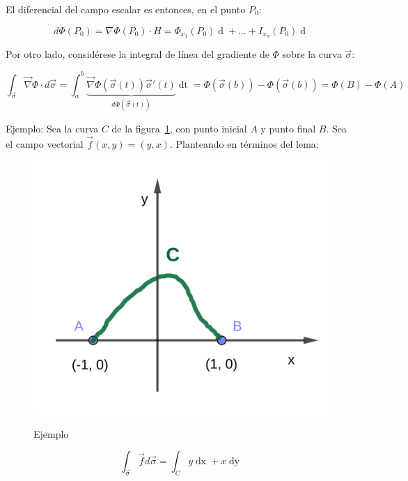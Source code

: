 \documentclass{article}
\begin{document}
El diferencial del campo escalar es entonces, en el punto $P_0$:

\begin{equation}
d\Phi(P_0) = \nabla\Phi(P_0) \cdot H = \Phi_{x_1}(P_0) \mathop{dx_1} + \ldots + I_{x_n}(P_0) \mathop{dx_n} 
\end{equation}

Por otro lado, considérese la integral de línea del gradiente de $\Phi$ sobre la curva $\overrightarrow{\sigma}$:

\begin{equation}
\int_{\overrightarrow{\sigma}} \overrightarrow{\nabla}\Phi \cdot d\overrightarrow{\sigma} = \int_a^b \underbrace{ \overrightarrow{\nabla}\Phi( \overrightarrow{\sigma}(t) ) \overrightarrow{\sigma}'(t) }_{d\Phi(\overrightarrow{\sigma}(t))} \mathop{dt} = \Phi(\overrightarrow{\sigma}(b)) - \Phi(\overrightarrow{\sigma}(b)) = \Phi(B) - \Phi(A)
\end{equation}

Ejemplo: Sea la curva $C$ de la figura~\ref{fig:ccej}, con punto inicial $A$ y punto final $B$. Sea el campo vectorial $\overrightarrow{f}(x,y) = (y, x)$. Planteando en términos del lema:

\begin{figure}[ht]
\centering
\caption{Ejemplo}
\includegraphics[scale=1]{img/teo_fig015_ccej.png}
\label{fig:ccej}
\end{figure}

\begin{equation}
\int_{\overrightarrow{\sigma}} \overrightarrow{f} d\overrightarrow{\sigma} = \int_C y \mathop{dx} + x \mathop{dy}
\end{equation}
\end{document}
